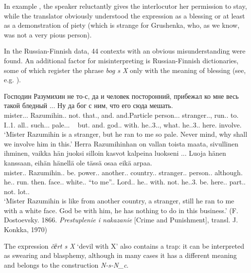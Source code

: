 \documentclass[output=paper]{langscibook}
\begin{document}
In example , the speaker reluctantly gives the interlocutor her permission to stay, while the translator obviously understood the expression as a blessing or at least as a demonstration of piety (which is strange for Grushenka, who, as we know, was not a very pious person).

In the Russian-Finnish data, 44 contexts with an obvious misunderstanding were found. An additional factor for misinterpreting is Russian-Finnish dictionaries, some of which register the phrase \textit{bog s X} only with the meaning of blessing (see, e.g. \citealt{KuusinenOllikainen1984}).

\ea
\gll Господин Разумихин не то-с, да и человек посторонний, прибежал ко мне весь такой бледный ... Ну да бог с ним, что его сюда мешать.\\
     mister.{\NOUN}.{\NOM}.{\SG} Razumihin.{\NOUNPROPER}.{\NOM} not.{\PTCP} that.{\PRON}, and.{\PTCP} and.Particle person.{\NOUN}.{\NOM}.{\SG} stranger.{\ADJ}.{\NOM}{\glossM}{\SG}, run.{\PAST}.{\glossM}{\SG} to.{\PREP} I.{\PRON}.1.{\DAT} all.{\PRON}{\glossM}.{\NOM} such.{\ADJ}.{\NOM}.{\SG} pale.{\ADJ}.{\NOM}{\glossM}{\SG}. ~ but.{\PTCP} and.{\PTCP} god.{\NOUN}{\glossM}.{\NOM} with.{\PREP} he.{\PRON}.3.{\INSTR}.{\SG}, what.{\PRON} he.{\PRON}.3.{\ACC}.{\SG} here.{\ADV} involve.{\glossINF}\\
\glt `Mister Razumihin is a stranger, but he ran to me so pale. Never mind, why shall we involve him in this.'
\ex
\gll Herra Razumihinhan on vallan toista maata, sivullinen ihminen, vaikka hän juoksi silloin kasvot kalpeina luokseni ... Luoja hänen kanssaan, eihän hänellä ole tässä osaa eikä arpaa.\\
     mister.{\NOUN}.{\NOM} Razumihin.{\NOUN}.{\NOM} be.{\PRES} power.{\NOUN}.{\GEN} another.{\ADJ}.{\PART} country.{\NOUN}.{\PART} stranger.{\ADJ}.{\NOM} person.{\NOUN}.{\NOM} although.{\CONJ} he.{\PRON}.{\NOM} run.{\PAST} then.{\ADV} face.{\NOUN}.{\NOM} white.{\ADJ}.{\ESSIVE} ``to me”.{\ADV}. Lord.{\NOUN}.{\NOM} he.{\PRON}.{\GEN} with.{\POSTP} not.{\PTCP} he.{\PRON}.3.{\ALL} be.{\PRES} here.{\ADV}.{\ADESS} part.{\NOUN}.{\PART} not.{\PTCP} lot.{\NOUN}.{\PART}{\SG}\\
\glt `Mister Razumihin is like from another country, a stranger, still he ran to me with a white face. God be with him, he has nothing to do in this business.' (F. Dostoevsky. 1866. \textit{Prestuplenie i nakazanie} [Crime and Punishment], transl. J. Konkka, 1970)
\z

The expression \textit{č{ёrt s X}} ‘devil with X’ also contains a trap: it can be interpreted as swearing and blasphemy, although in many cases it has a different meaning and belongs to the construction  \textit{N-s-N\_c}.
\end{document}
